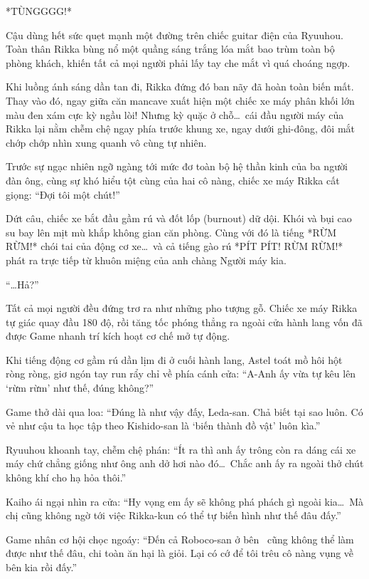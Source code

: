 \documentclass[../main.tex]{subfiles}
\begin{document}
*TÙNGGGG!*

Cậu dùng hết sức quẹt mạnh một đường trên chiếc guitar điện của Ryuuhou. Toàn thân Rikka bùng nổ một quầng sáng trắng lóa mắt bao trùm toàn bộ phòng khách, khiến tất cả mọi người phải lấy tay che mắt vì quá choáng ngợp.

Khi luồng ánh sáng dần tan đi, Rikka đứng đó ban nãy đã hoàn toàn biến mất. Thay vào đó, ngay giữa căn mancave xuất hiện một chiếc xe máy phân khối lớn màu đen xám cực kỳ ngầu lòi! Nhưng kỳ quặc ở chỗ\dots\ cái đầu người máy của Rikka lại nằm chễm chệ ngay phía trước khung xe, ngay dưới ghi-đông, đôi mắt chớp chớp nhìn xung quanh vô cùng tự nhiên.


Trước sự ngạc nhiên ngỡ ngàng tới mức đơ toàn bộ hệ thần kinh của ba người đàn ông, cùng sự khó hiểu tột cùng của hai cô nàng, chiếc xe máy Rikka cất giọng: ``Đợi tôi một chút!''

Dứt câu, chiếc xe bắt đầu gầm rú và đốt lốp (burnout) dữ dội. Khói và bụi cao su bay lên mịt mù khắp không gian căn phòng. Cùng với đó là tiếng *RỪM RỪM!* chói tai của động cơ xe\dots\ và cả tiếng gào rú *PÍT PÍT! RỪM RỪM!* phát ra trực tiếp từ khuôn miệng của anh chàng Người máy kia.

``\dots Hả?''

Tất cả mọi người đều đứng trơ ra như những pho tượng gỗ. Chiếc xe máy Rikka tự giác quay đầu 180 độ, rồi tăng tốc phóng thẳng ra ngoài cửa hành lang vốn đã được Game nhanh trí kích hoạt cơ chế mở tự động.

Khi tiếng động cơ gầm rú dần lịm đi ở cuối hành lang, Astel toát mồ hôi hột ròng ròng, giơ ngón tay run rẩy chỉ về phía cánh cửa: ``A-Anh ấy vừa tự kêu lên `rừm rừm' như thế, đúng không?''

Game thở dài qua loa: ``Đúng là như vậy đấy, Leda-san. Chả biết tại sao luôn. Có vẻ như cậu ta học tập theo Kishido-san là `biến thành đồ vật' luôn kìa.''

Ryuuhou khoanh tay, chễm chệ phán: ``Ít ra thì anh ấy trông còn ra dáng cái xe máy chứ chẳng giống như ông anh dở hơi nào đó\dots\ Chắc anh ấy ra ngoài thở chút không khí cho hạ hỏa thôi.''

Kaiho ái ngại nhìn ra cửa: ``Hy vọng em ấy sẽ không phá phách gì ngoài kia\dots\ Mà chị cũng không ngờ tới việc Rikka-kun có thể tự biến hình như thế đâu đấy.''

Game nhân cơ hội chọc ngoáy: ``Đến cả Roboco-san ở bên \hll\ cũng không thể làm được như thế đâu, chi toàn ăn hại là giỏi. Lại có cớ để tôi trêu cô nàng vụng về bên kia rồi đấy.''
\end{document}
